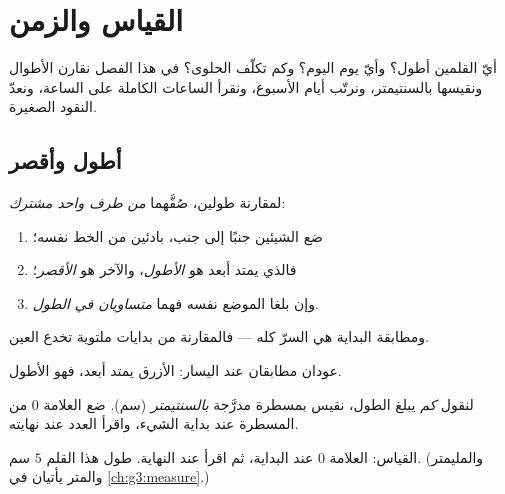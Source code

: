 \chapter{القياس والزمن}\label{ch:g1:measure}

أيّ القلمين أطول؟ وأيّ يوم اليوم؟ وكم تكلّف الحلوى؟ في هذا الفصل
نقارن الأطوال ونقيسها بالسنتيمتر، ونرتّب أيام الأسبوع، ونقرأ
الساعات الكاملة على الساعة، ونعدّ النقود
الصغيرة.

\section{أطول وأقصر}

\begin{method}\label{met:g1:measure:compare}
لمقارنة طولين، صُفَّهما \emph{من طرف واحد مشترك}:
\begin{enumerate}
  \item ضع الشيئين جنبًا إلى جنب، بادئين من الخط نفسه؛
  \item فالذي يمتد أبعد هو \emph{الأطول}، والآخر هو
        \emph{الأقصر}؛
  \item وإن بلغا الموضع نفسه فهما \emph{متساويان في
        الطول}.
\end{enumerate}
ومطابقة البداية هي السرّ كله --- فالمقارنة من بدايات ملتوية تخدع
العين.
\end{method}

\begin{omfigure}

{\small عودان مطابقان عند اليسار: الأزرق يمتد أبعد،
فهو الأطول.}
\end{omfigure}

\begin{definition}[السنتيمتر]\label{def:g1:measure:cm}
لنقول \emph{كم} يبلغ الطول، نقيس بمسطرة مدرَّجة
\emph{بالسنتيمتر} (سم). ضع العلامة $0$ من المسطرة
عند بداية الشيء، واقرأ العدد عند نهايته.
\end{definition}

\begin{omfigure}

{\small القياس: العلامة $0$ عند البداية، ثم اقرأ عند النهاية. طول
هذا القلم $5$ سم. (والمليمتر والمتر يأتيان في
\cref{ch:g3:measure}.)}
\end{omfigure}


